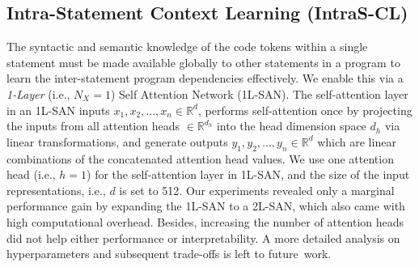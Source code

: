 



\vspace{2pt}
\subsection{{\bf Intra-Statement Context Learning (IntraS-CL)}}
\label{sec:ppda_arch_intra}
The syntactic and semantic knowledge of the code tokens within a
single statement must be made available globally to other statements
in a program to learn the inter-statement program dependencies
effectively. We enable this via a \textit{1-Layer} (i.e., $N_X$$=$$1$)
Self Attention Network (1L-SAN). The self-attention layer in an 1L-SAN
inputs $x_1, x_2, ..., x_n \in \mathbb{R}^d$, performs self-attention
once by projecting the inputs from all attention heads $\in
\mathbb{R}^{d_h}$ into the head dimension space $d_h$ via linear
transformations, and generate outputs $y_1, y_2, ..., y_n \in
\mathbb{R}^d$ which are linear combinations of the concatenated
attention head values. We use one attention head
(i.e., $h$$=$$1$) for the self-attention layer in 1L-SAN, and the size
of the input representations, i.e., $d$ is set to 512. Our experiments
revealed only a marginal performance gain by expanding the 1L-SAN to a
2L-SAN, which also came with high computational
overhead. Besides, increasing the number of attention heads did not
help either performance or interpretability. A more detailed analysis
on hyperparameters and subsequent
trade-offs is left to future~work.

